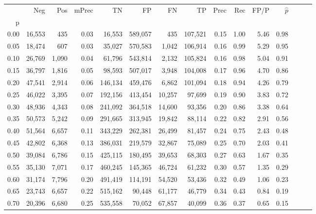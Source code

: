 \begin{tabular}{rrrrrrrrrrrrrrr}
\toprule
{} &     Neg &    Pos & mPrec &       TN &       FP &       FN &       TP &  Prec &   Rec &  FP/P & $\hat{p}$ \\
p    &         &        &       &          &          &          &          &       &       &       &           \\
\midrule
0.00 &  16,553 &    435 &  0.03 &   16,553 &  589,057 &      435 &  107,521 &  0.15 &  1.00 &  5.46 &      0.98 \\
0.05 &  18,474 &    607 &  0.03 &   35,027 &  570,583 &    1,042 &  106,914 &  0.16 &  0.99 &  5.29 &      0.95 \\
0.10 &  26,769 &  1,090 &  0.04 &   61,796 &  543,814 &    2,132 &  105,824 &  0.16 &  0.98 &  5.04 &      0.91 \\
0.15 &  36,797 &  1,816 &  0.05 &   98,593 &  507,017 &    3,948 &  104,008 &  0.17 &  0.96 &  4.70 &      0.86 \\
0.20 &  47,541 &  2,914 &  0.06 &  146,134 &  459,476 &    6,862 &  101,094 &  0.18 &  0.94 &  4.26 &      0.79 \\
0.25 &  46,022 &  3,395 &  0.07 &  192,156 &  413,454 &   10,257 &   97,699 &  0.19 &  0.90 &  3.83 &      0.72 \\
0.30 &  48,936 &  4,343 &  0.08 &  241,092 &  364,518 &   14,600 &   93,356 &  0.20 &  0.86 &  3.38 &      0.64 \\
0.35 &  50,573 &  5,242 &  0.09 &  291,665 &  313,945 &   19,842 &   88,114 &  0.22 &  0.82 &  2.91 &      0.56 \\
0.40 &  51,564 &  6,657 &  0.11 &  343,229 &  262,381 &   26,499 &   81,457 &  0.24 &  0.75 &  2.43 &      0.48 \\
0.45 &  42,802 &  6,368 &  0.13 &  386,031 &  219,579 &   32,867 &   75,089 &  0.25 &  0.70 &  2.03 &      0.41 \\
0.50 &  39,084 &  6,786 &  0.15 &  425,115 &  180,495 &   39,653 &   68,303 &  0.27 &  0.63 &  1.67 &      0.35 \\
0.55 &  35,130 &  7,071 &  0.17 &  460,245 &  145,365 &   46,724 &   61,232 &  0.30 &  0.57 &  1.35 &      0.29 \\
0.60 &  31,174 &  7,796 &  0.20 &  491,419 &  114,191 &   54,520 &   53,436 &  0.32 &  0.49 &  1.06 &      0.23 \\
0.65 &  23,743 &  6,657 &  0.22 &  515,162 &   90,448 &   61,177 &   46,779 &  0.34 &  0.43 &  0.84 &      0.19 \\
0.70 &  20,396 &  6,680 &  0.25 &  535,558 &   70,052 &   67,857 &   40,099 &  0.36 &  0.37 &  0.65 &      0.15 \\

\end{tabular}
